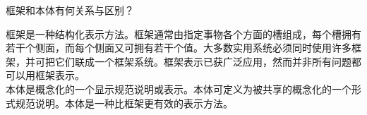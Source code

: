 \begin{question}
框架和本体有何关系与区别？
\end{question}
\begin{solution}
框架是一种结构化表示方法。框架通常由指定事物各个方面的槽组成，每个槽拥有若干个侧面，而每个侧面又可拥有若干个值。大多数实用系统必须同时使用许多框架，并可把它们联成一个框架系统。框架表示已获广泛应用，然而并非所有问题都可以用框架表示。\\
本体是概念化的一个显示规范说明或表示。本体可定义为被共享的概念化的一个形式规范说明。本体是一种比框架更有效的表示方法。
\end{solution}